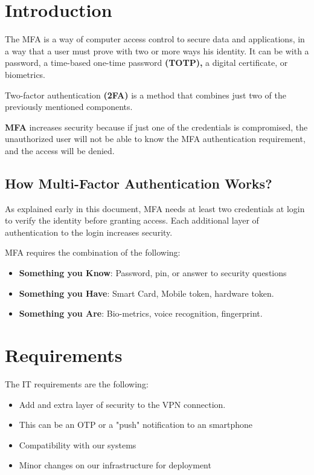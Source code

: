 \section{Introduction}

The MFA is a way of computer access control to secure data and applications,  in a way that a user must prove with two or more ways his identity. 
It can be with a password, a time-based one-time password\textbf{ (TOTP),} a digital certificate, or biometrics.

 Two-factor authentication \textbf{(2FA)} is a method that combines just two of the previously mentioned components.

\textbf{MFA} increases security because if just one of the credentials is compromised, the unauthorized user will not be able to know the MFA authentication requirement, and the access will be denied.


\subsection{How Multi-Factor Authentication Works?
}
As explained early in this document, MFA needs at least two credentials at login to verify the identity before granting access. Each additional layer of authentication to the login increases security.

MFA requires the combination of the following:


\begin{itemize}
\item \textbf{Something you Know}: Password, pin, or answer to security questions
\item \textbf{Something you Have}: Smart Card, Mobile token, hardware token.
\item \textbf{Something you Are}: Bio-metrics, voice recognition, fingerprint.
\end{itemize}

\newpage
\section{Requirements}
 
The IT requirements are the following:

\begin{itemize}
  \item Add and extra layer of security to the VPN connection.
  \item This can be an OTP or a "push" notification to an smartphone
  \item Compatibility with our systems
  \item Minor changes on our infrastructure for deployment
  \end{itemize}
  
